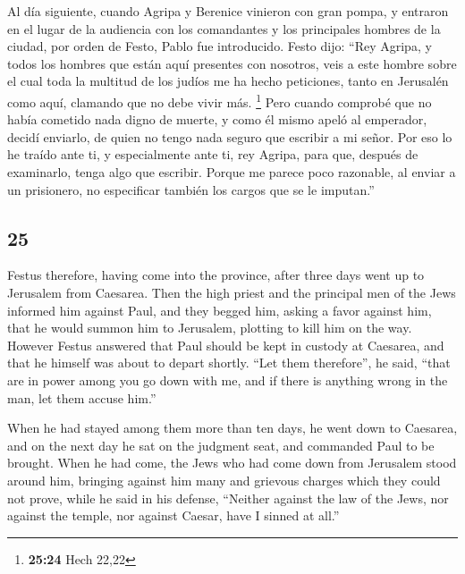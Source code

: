 \begin{paracol}{2}
 Al día siguiente, cuando Agripa y Berenice vinieron con
gran pompa, y entraron en el lugar de la audiencia con los comandantes y
los principales hombres de la ciudad, por orden de Festo, Pablo fue
introducido.  Festo dijo: ``Rey Agripa, y todos los
hombres que están aquí presentes con nosotros, veis a este hombre sobre
el cual toda la multitud de los judíos me ha hecho peticiones, tanto en
Jerusalén como aquí, clamando que no debe vivir más. \footnote{\textbf{25:24}
  Hech 22,22}  Pero cuando comprobé que no había cometido
nada digno de muerte, y como él mismo apeló al emperador, decidí
enviarlo,  de quien no tengo nada seguro que escribir a
mi señor. Por eso lo he traído ante ti, y especialmente ante ti, rey
Agripa, para que, después de examinarlo, tenga algo que escribir.
 Porque me parece poco razonable, al enviar a un
prisionero, no especificar también los cargos que se le imputan.''

\switchcolumn
\begin{otherlanguage}{english}

\hypertarget{section-49}{%
\section{25}\label{section-49}}

 Festus therefore, having come into the province, after
three days went up to Jerusalem from Caesarea.  Then the
high priest and the principal men of the Jews informed him against Paul,
and they begged him,  asking a favor against him, that he
would summon him to Jerusalem, plotting to kill him on the way.
 However Festus answered that Paul should be kept in
custody at Caesarea, and that he himself was about to depart shortly.
 ``Let them therefore'', he said, ``that are in power
among you go down with me, and if there is anything wrong in the man,
let them accuse him.''

 When he had stayed among them more than ten days, he went
down to Caesarea, and on the next day he sat on the judgment seat, and
commanded Paul to be brought.  When he had come, the Jews
who had come down from Jerusalem stood around him, bringing against him
many and grievous charges which they could not prove, 
while he said in his defense, ``Neither against the law of the Jews, nor
against the temple, nor against Caesar, have I sinned at all.''


\end{otherlanguage}
\end{paracol}
